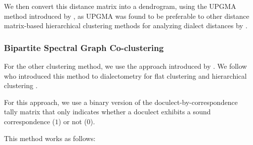 \documentclass[a4paper]{article}
\begin{document}
We then convert this distance matrix into a dendrogram,
using the UPGMA method introduced by \citet{sokal1958statistical},
as UPGMA was found to be preferable to other
distance matrix-based hierarchical clustering methods
for analyzing dialect distances by \citet{heeringa2004measuring}.


\subsubsection{Bipartite Spectral Graph Co-clustering}
\label{subsubsec:bsgc}

For the other clustering method, we use the approach
introduced by \citet{dhillon2001co-clustering}.
We follow \citeauthor*{wieling2009bipartite} who introduced
this method to dialectometry for flat clustering \citeyearpar{wieling2009bipartite} and hierarchical clustering \citeyearpar{wieling2010hierarchical}.

For this approach, we use a binary version of the
doculect-by-correspondence tally matrix that only
indicates whether a doculect exhibits
a sound correspondence ($1$) or not ($0$).

This method works as follows:
\end{document}
